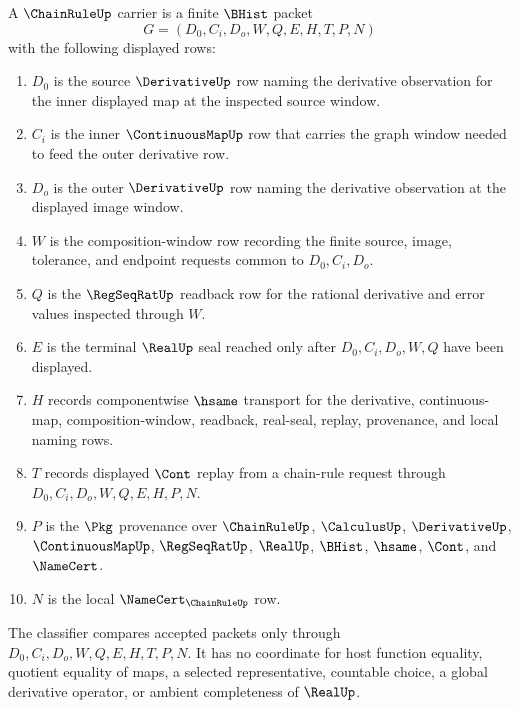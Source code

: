 \begin{definition}
\label{def:chain-rule-carrier}
A $\ChainRuleUp$ carrier is a finite $\BHist$ packet
$$
G=(D_0,C_i,D_o,W,Q,E,H,T,P,N)
$$
with the following displayed rows:
\begin{enumerate}
\item $D_0$ is the source $\DerivativeUp$ row naming the derivative observation for the inner displayed map at the inspected source window.
\item $C_i$ is the inner $\ContinuousMapUp$ row that carries the graph window needed to feed the outer derivative row.
\item $D_o$ is the outer $\DerivativeUp$ row naming the derivative observation at the displayed image window.
\item $W$ is the composition-window row recording the finite source, image, tolerance, and endpoint requests common to $D_0,C_i,D_o$.
\item $Q$ is the $\RegSeqRatUp$ readback row for the rational derivative and error values inspected through $W$.
\item $E$ is the terminal $\RealUp$ seal reached only after $D_0,C_i,D_o,W,Q$ have been displayed.
\item $H$ records componentwise $\hsame$ transport for the derivative, continuous-map, composition-window, readback, real-seal, replay, provenance, and local naming rows.
\item $T$ records displayed $\Cont$ replay from a chain-rule request through $D_0,C_i,D_o,W,Q,E,H,P,N$.
\item $P$ is the $\Pkg$ provenance over $\ChainRuleUp$, $\CalculusUp$, $\DerivativeUp$, $\ContinuousMapUp$, $\RegSeqRatUp$, $\RealUp$, $\BHist$, $\hsame$, $\Cont$, and $\NameCert$.
\item $N$ is the local $\NameCert_{\ChainRuleUp}$ row.
\end{enumerate}
The classifier compares accepted packets only through $D_0,C_i,D_o,W,Q,E,H,T,P,N$. It has no coordinate for host function equality, quotient equality of maps, a selected representative, countable choice, a global derivative operator, or ambient completeness of $\RealUp$.
\end{definition}

